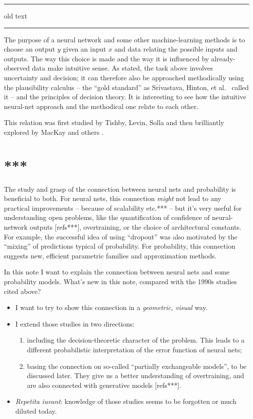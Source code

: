\documentclass[\ifafour a4paper,12pt,\else a5paper,10pt,\fi%
onecolumn,oneside,article,%
british%
]{memoir}
\theoremstyle{remark}
\theoremstyle{innote}
\newcommand*{\citep}{\parencites}
\newcommand*{\citey}{\parencites*}
\renewcommand*{\|}{\mathpunct{|}}
\newcommand*{\etc}{{etc.}}
\newcommand*{\etal}{{et al.}}
\begin{document}
\clearpage
\hrule
old text
\hrule

The purpose of a neural network and some other machine-learning methods is
to choose an output $y$ given an input $x$ and data relating the possible
inputs and outputs. The way this choice is made and the way it is
influenced by already-observed data make intuitive sense. As stated, the
task above involves uncertainty and decision; it can therefore also be
approached methodically using the plausibility calculus -- the
\enquote{gold standard} as Srivastava, Hinton, \etal\
\citey{srivastavaetal2014} called it -- and the principles of decision
theory. It is interesting to see how the intuitive neural-net approach and
the methodical one relate to each other.

This relation was first studied by Tishby, Levin, Solla
\citep{tishbyetal1989,levinetal1990} and then brilliantly explored by
MacKay \citey{mackay1992,mackay1992b} and others
\citey{neal1996,barberetal1998}.

\section{***}





The study and grasp of the connection between neural nets and probability
is beneficial to both. For neural nets, this connection \emph{might} not
lead to any practical improvements -- because of scalability \etc*** -- but
it's very useful for understanding open problems, like the quantification
of confidence of neural-network outputs [refs***], overtraining, or the
choice of architectural constants. For example, the successful idea of
using \enquote{dropout} was also motivated
\citep{hintonetal2012,srivastavaetal2014} by the \enquote{mixing} of
predictions typical of probability. For probability, this connection
suggests new, efficient parametric families and approximation methods.

\medskip

In this note I want to explain the connection between neural nets and some
probability models. What's new in this note, compared with the 1990s
studies cited above?
\begin{itemize}
\item I want to try to show this connection in a \emph{geometric, visual}
  way.
\item I extend those studies in two directions:
  \begin{enumerate}[label=\arabic*.]
  \item including the decision-theoretic character of the problem. This
    leads to a different probabilistic interpretation of the error function
    of neural nets;
  \item basing the connection on so-called \enquote{partially exchangeable
      models}, to be discussed later. They give us a better understanding
    of overtraining, and are also connected with generative models
    [refs***].
  \end{enumerate}
\item\emph{Repetita iuvant}: knowledge of those studies seems to be
  forgotten or much diluted today.
\end{itemize}
\end{document}
